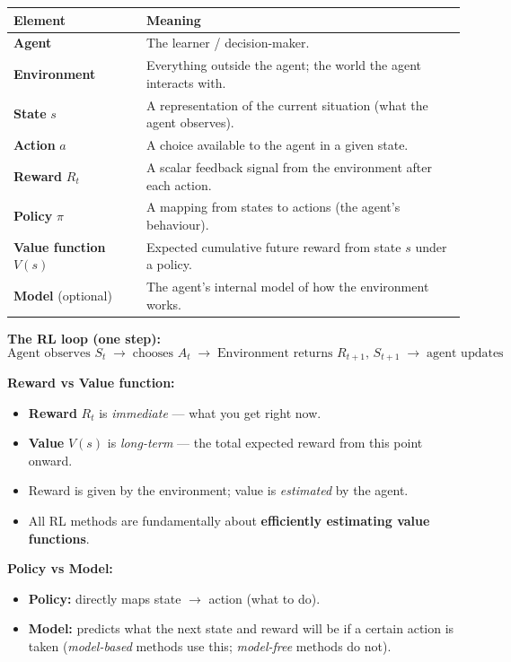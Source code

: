 \documentclass[11pt,a4paper]{article}
\begin{document}
\begin{tcolorbox}[defn={The 6 Core Elements}]
\begin{tabular}{p{3cm}p{11cm}}
\toprule
\textbf{Element} & \textbf{Meaning} \\
\midrule
\textbf{Agent} & The learner / decision-maker. \\
\textbf{Environment} & Everything outside the agent; the world the agent interacts with. \\
\textbf{State} $s$ & A representation of the current situation (what the agent observes). \\
\textbf{Action} $a$ & A choice available to the agent in a given state. \\
\textbf{Reward} $R_t$ & A scalar feedback signal from the environment after each action. \\
\textbf{Policy} $\pi$ & A mapping from states to actions (the agent's behaviour). \\
\textbf{Value function} $V(s)$ & Expected cumulative future reward from state $s$ under a policy. \\
\textbf{Model} (optional) & The agent's internal model of how the environment works. \\
\bottomrule
\end{tabular}
\end{tcolorbox}

\textbf{The RL loop (one step):}
\[
  \text{Agent observes } S_t \;\longrightarrow\; \text{chooses } A_t \;\longrightarrow\;
  \text{Environment returns } R_{t+1},\, S_{t+1} \;\longrightarrow\; \text{agent updates}
\]

\textbf{Reward vs Value function:}
\begin{itemize}
  \item \textbf{Reward} $R_t$ is \emph{immediate} — what you get right now.
  \item \textbf{Value} $V(s)$ is \emph{long-term} — the total expected reward from this point onward.
  \item Reward is given by the environment; value is \emph{estimated} by the agent.
  \item All RL methods are fundamentally about \textbf{efficiently estimating value functions}.
\end{itemize}

\textbf{Policy vs Model:}
\begin{itemize}
  \item \textbf{Policy:} directly maps state $\to$ action (what to do).
  \item \textbf{Model:} predicts what the next state and reward will be if a certain action is taken
    (\emph{model-based} methods use this; \emph{model-free} methods do not).
\end{itemize}
\end{document}

